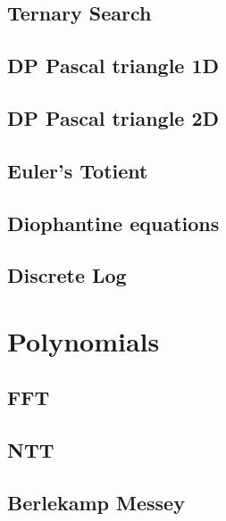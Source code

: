 \documentclass[10pt]{article}
\begin{document}
\begin{multicols*}{2}
\subsection{Ternary Search}

\subsection{DP Pascal triangle 1D}

\subsection{DP Pascal triangle 2D}



\subsection{Euler's Totient}


\subsection{Diophantine equations}


\subsection{Discrete Log}


\section{Polynomials}

\subsection{FFT}


\subsection{NTT}


\subsection{Berlekamp Messey}



\end{multicols*}
\end{document}
